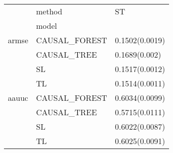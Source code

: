 \begin{tabular}{lll}
\toprule
      & method &              ST \\
{} & model &                 \\
\midrule
armse & CAUSAL\_FOREST &  0.1502(0.0019) \\
      & CAUSAL\_TREE &   0.1689(0.002) \\
      & SL &  0.1517(0.0012) \\
      & TL &  0.1514(0.0011) \\
aauuc & CAUSAL\_FOREST &  0.6034(0.0099) \\
      & CAUSAL\_TREE &  0.5715(0.0111) \\
      & SL &  0.6022(0.0087) \\
      & TL &  0.6025(0.0091) \\
\bottomrule
\end{tabular}
